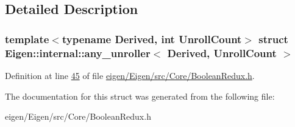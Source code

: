 \subsection{Detailed Description}
\subsubsection*{template$<$typename Derived, int Unroll\+Count$>$\newline
struct Eigen\+::internal\+::any\+\_\+unroller$<$ Derived, Unroll\+Count $>$}



Definition at line \hyperlink{eigen_2_eigen_2src_2_core_2_boolean_redux_8h_source_l00045}{45} of file \hyperlink{eigen_2_eigen_2src_2_core_2_boolean_redux_8h_source}{eigen/\+Eigen/src/\+Core/\+Boolean\+Redux.\+h}.



The documentation for this struct was generated from the following file\+:\begin{DoxyCompactItemize}
\item 
eigen/\+Eigen/src/\+Core/\+Boolean\+Redux.\+h\end{DoxyCompactItemize}
